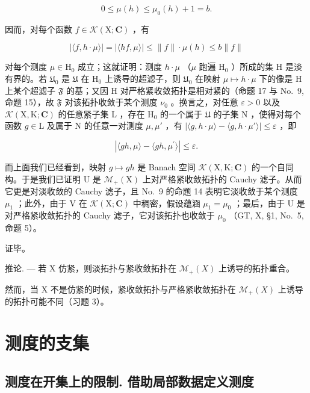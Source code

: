 \[
0 \leqslant \mu (h) \leqslant \mu_ {0} (h) + 1 = b.
\]

因而，对每个函数 \(f \in \mathcal{K}(\mathrm{X};\mathbf{C})\) ，有

\[
| \langle f, h \cdot \mu \rangle | = | \langle h f, \mu \rangle | \leqslant \| f \| \cdot \mu (h) \leqslant b \| f \|
\]

对每个测度 \(\mu\in\mathrm{H}_{0}\) 成立；这就证明：测度 \(h\cdot\mu\) （\(\mu\) 跑遍 \(\mathrm{H}_{0}\) ）所成的集 H 是淡有界的。若 \(\mathfrak{U}_{0}\) 是 \(\mathfrak{U}\) 在 \(\mathrm{H}_{0}\) 上诱导的超滤子，则 \(\mathfrak{U}_{0}\) 在映射 \(\mu\mapsto h\cdot\mu\) 下的像是 H 上某个超滤子 \(\mathfrak{F}\) 的基；又因 H 对严格紧收敛拓扑是相对紧的（命题 17 与 No.~9, 命题 15），故 \(\mathfrak{F}\) 对该拓扑收敛于某个测度 \(\nu_{0}\) 。换言之，对任意 \(\varepsilon>0\) 以及 \(\mathcal{K}(\mathrm{X},\mathrm{K};\mathbf{C})\) 的任意紧子集 L ，存在 \(\mathrm{H}_{0}\) 的一个属于 \(\mathfrak{U}\) 的子集 N ，使得对每个函数 \(g\in\mathrm{L}\) 及属于 N 的任意一对测度 \(\mu,\mu'\) ，有 \(|\langle g,h\cdot\mu\rangle-\langle g,h\cdot\mu'\rangle|\leqslant\varepsilon\) ，即

\[
| \langle g h, \mu \rangle - \langle g h, \mu^ {\prime} \rangle | \leqslant \varepsilon .
\]

而上面我们已经看到，映射 \(g \mapsto gh\) 是 Banach 空间 \(\mathcal{K}(\mathrm{X},\mathrm{K};\mathbf{C})\) 的一个自同构。于是我们已证明 U 是 \(\mathcal{M}_{+}(\mathrm{X})\) 上对严格紧收敛拓扑的 Cauchy 滤子。从而它更是对淡收敛的 Cauchy 滤子，且 No.~9 的命题 14 表明它淡收敛于某个测度 \(\mu_{1}\) ；此外，由于 V 在 \(\mathcal{K}(\mathrm{X};\mathbf{C})\) 中稠密，假设蕴涵 \(\mu_{1} = \mu_{0}\) ；最后，由于 U 是对严格紧收敛拓扑的 Cauchy 滤子，它对该拓扑也收敛于 \(\mu_{0}\) （GT, X, §1, No.~5, 命题 5）。

证毕。

推论. --- 若 X 仿紧，则淡拓扑与紧收敛拓扑在 \(\mathcal{M}_{+}(X)\) 上诱导的拓扑重合。

然而，当 X 不是仿紧的时候，紧收敛拓扑与严格紧收敛拓扑在 \(\mathcal{M}_{+}(X)\) 上诱导的拓扑可能不同（习题 3）。

\section{测度的支集}

\subsection{测度在开集上的限制. 借助局部数据定义测度}

